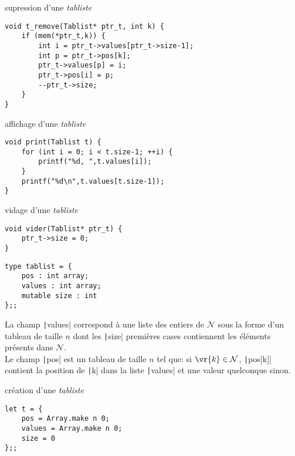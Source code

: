 \begin{fnc*}{supression d'une \emph{tabliste}}
\begin{verbatim}
void t_remove(Tablist* ptr_t, int k) {
    if (mem(*ptr_t,k)) {
        int i = ptr_t->values[ptr_t->size-1];
        int p = ptr_t->pos[k];
        ptr_t->values[p] = i;
        ptr_t->pos[i] = p;
        --ptr_t->size;
    }
}
\end{verbatim}
\end{fnc*}
\begin{fnc*}{affichage d'une \emph{tabliste}}
\begin{verbatim}
void print(Tablist t) {
    for (int i = 0; i < t.size-1; ++i) {
        printf("%d, ",t.values[i]);
    }
    printf("%d\n",t.values[t.size-1]);
}
\end{verbatim}
\end{fnc*}
\begin{fnc*}{vidage d'une \emph{tabliste}}
\begin{verbatim}
void vider(Tablist* ptr_t) {
    ptr_t->size = 0;
}
\end{verbatim}
\end{fnc*}
\ocaml
\begin{tp*}{}
\begin{verbatim}
type tablist = {
    pos : int array;
    values : int array;
    mutable size : int
};;
\end{verbatim}
La champ \texttt|values| correspond à une liste des entiers de $\mathcal{N}$ sous la forme d'un tableau de taille $n$ dont les \texttt|size| premières cases contiennent les éléments présents dans $\mathcal{N}$.\\Le champ \texttt|pos| est un tableau de taille $n$ tel que: si $\vr{k}\in\mathcal{N}$, \texttt|pos[k]| contient la position de \texttt|k| dans la liste \texttt|values| et une valeur quelconque sinon.
\end{tp*}
\begin{fnc*}{création d'une \emph{tabliste}}
\begin{verbatim}
let t = {
    pos = Array.make n 0;
    values = Array.make n 0;
    size = 0
};;
\end{verbatim}
\end{fnc*}
